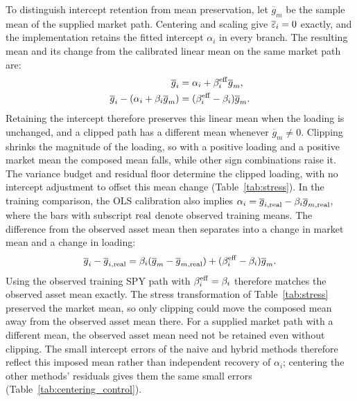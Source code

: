 To distinguish intercept retention from mean preservation, let
$\overline{g}_m$ be the sample mean of the supplied market path.
Centering and scaling give $\overline{\varepsilon}_i=0$ exactly, and the
implementation retains the fitted intercept $\alpha_i$ in every
branch. The resulting mean and its change from the calibrated linear
mean on the same market path are:
\begin{align}
  \overline{g}_i
    &= \alpha_i+\beta_i^{\mathrm{eff}}\overline{g}_m, \notag\\
  \overline{g}_i-(\alpha_i+\beta_i\overline{g}_m)
    &= (\beta_i^{\mathrm{eff}}-\beta_i)\overline{g}_m.
  \label{eq:supp-clipped-mean}
\end{align}
Retaining the intercept therefore preserves this linear mean when the
loading is unchanged, and a clipped path has a different mean whenever
$\overline{g}_m\ne0$. Clipping shrinks the magnitude of the loading,
so with a positive loading and a positive market mean the composed
mean falls, while other sign combinations raise it. The variance
budget and residual floor determine the clipped loading, with no
intercept adjustment to offset this mean change
(Table~\ref{tab:stress}). In the training comparison, the OLS
calibration also implies
$\alpha_i=\overline{g}_{i,\mathrm{real}}-\beta_i\overline{g}_{m,\mathrm{real}}$,
where the bars with subscript $\mathrm{real}$ denote observed training means.
The difference from the observed asset mean then separates into a
change in market mean and a change in loading:
\begin{equation}
  \overline{g}_i-\overline{g}_{i,\mathrm{real}}
  = \beta_i(\overline{g}_m-\overline{g}_{m,\mathrm{real}})
    +(\beta_i^{\mathrm{eff}}-\beta_i)\overline{g}_m.
  \label{eq:supp-training-mean-shift}
\end{equation}
Using the observed training SPY path with $\beta_i^{\mathrm{eff}}=\beta_i$
therefore matches the observed asset mean exactly. The stress
transformation of Table~\ref{tab:stress} preserved the market mean, so
only clipping could move the composed mean away from the observed
asset mean there. For a supplied market path with a different mean,
the observed asset mean need not be retained even without clipping.
The small intercept errors of the naive and hybrid methods therefore
reflect this imposed mean rather than independent recovery of
$\alpha_i$; centering the other methods' residuals gives them the
same small errors (Table~\ref{tab:centering_control}).

